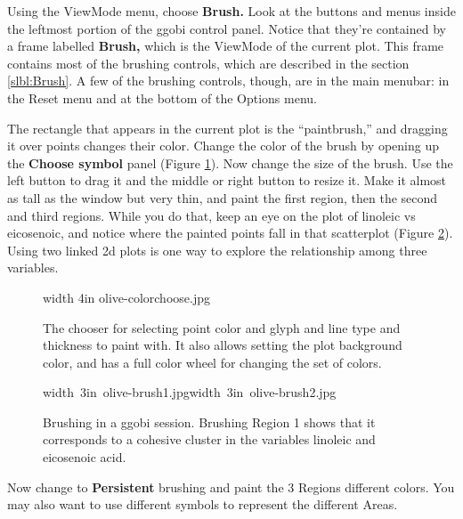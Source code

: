 \documentclass[11pt]{article}
\begin{document}
Using the ViewMode menu, choose {\bf Brush.}  Look at the buttons and
menus inside the leftmost portion of the ggobi control panel.  Notice
that they're contained by a frame labelled {\bf Brush,} which is the
ViewMode of the current plot.  This frame contains most of the
brushing controls, which are described in the section
\ref{slbl:Brush}.  A few of the brushing controls, though, are in the
main menubar: in the Reset menu and at the bottom of the Options menu.

The rectangle that appears in the current plot is the ``paintbrush,''
and dragging it over points changes their color. Change the color of
the brush by opening up the {\bf Choose symbol} panel (Figure
\ref{fig2}). Now change the size of the brush.  Use the left button to
drag it and the middle or right button to resize it.  Make it almost
as tall as the window but very thin, and paint the first region, then
the second and third regions.  While you do that, keep an eye on the
plot of linoleic vs eicosenoic, and notice where the painted points
fall in that scatterplot (Figure \ref{fig3}).  Using two linked 2d
plots is one way to explore the relationship among three variables.

\begin{figure}[htp]
\vspace{-0.5in}
\pdfimage width 4in {olive-colorchoose.jpg}
\caption{The chooser for selecting point color and glyph and line
type and thickness to paint with. It also allows setting the plot
background color, and has a full color wheel for changing the set of
colors.
}%
\label{fig2}
\end{figure}

\begin{figure}[htp]
\hbox{\pdfimage width 3in {olive-brush1.jpg}\pdfimage width 3in {olive-brush2.jpg}}
\caption{Brushing in a ggobi session. Brushing Region 1 shows that it
corresponds to a cohesive cluster in the variables linoleic and 
eicosenoic acid.
}%
\label{fig3}
\end{figure}

Now change to {\bf Persistent} brushing and paint the 3 Regions
different colors. You may also want to use different symbols to
represent the different Areas. 
\end{document}
